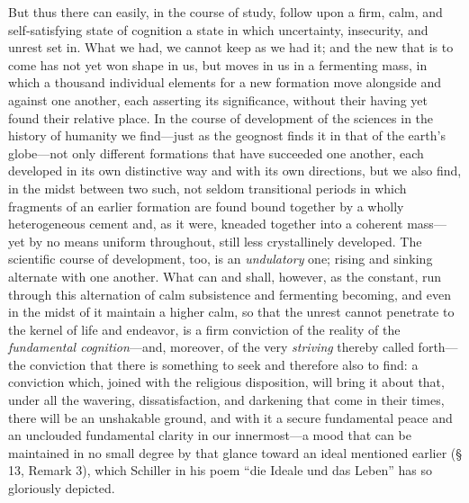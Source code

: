\documentclass[12pt,a4paper]{book}
\begin{document}
But thus there can easily, in the course of study, follow upon a firm, calm, and self-satisfying
state of cognition a state in which uncertainty, insecurity, and unrest set in. What we had, we
cannot keep as we had it; and the new that is to come has not yet won shape in us, but moves in us in
a fermenting mass, in which a thousand individual elements for a new formation move alongside and
against one another, each asserting its significance, without their having yet found their relative
place. In the course of development of the sciences in the history of humanity we find---just as the
geognost finds it in that of the earth's globe---not only different formations that have succeeded
one another, each developed in its own distinctive way and with its own directions, but we also find,
in the midst between two such, not seldom transitional periods in which fragments of an earlier
formation are found bound together by a wholly heterogeneous cement and, as it were, kneaded together
into a coherent mass---yet by no means uniform throughout, still less crystallinely developed. The
scientific course of development, too, is an \emph{undulatory} one; rising and sinking alternate with
one another. What can and shall, however, as the constant, run through this alternation of calm
subsistence and fermenting becoming, and even in the midst of it maintain a higher calm, so that the
unrest cannot penetrate to the kernel of life and endeavor, is a firm conviction of the reality of
the \emph{fundamental cognition}---and, moreover, of the very \emph{striving} thereby called
forth---the conviction that there is something to seek and therefore also to find: a conviction which,
joined with the religious disposition, will bring it about that, under all the wavering,
dissatisfaction, and darkening that come in their times, there will be an unshakable ground, and with
it a secure fundamental peace and an unclouded fundamental clarity in our innermost---a mood that can
be maintained in no small degree by that glance toward an ideal mentioned earlier (§ 13, Remark 3),
which Schiller in his poem ``die Ideale und das Leben'' has so gloriously depicted.
\end{document}
